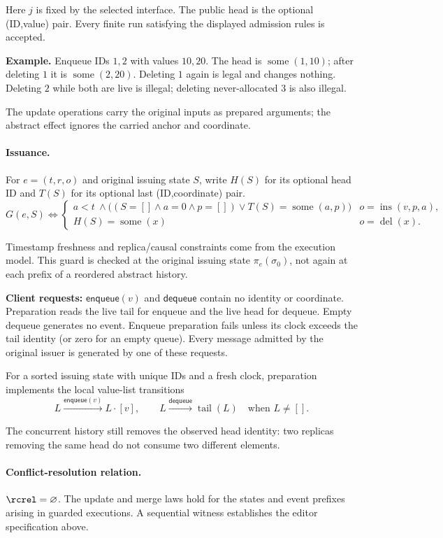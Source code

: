 Here $j$ is fixed by the selected interface. The public head is the optional (ID,value) pair. Every finite run satisfying the displayed admission rules is accepted.

\textbf{Example.} Enqueue IDs $1,2$ with values $10,20$. The head is $\operatorname{some}(1,10)$; after deleting $1$ it is $\operatorname{some}(2,20)$. Deleting $1$ again is legal and changes nothing. Deleting $2$ while both are live is illegal; deleting never-allocated $3$ is also illegal.

The update operations carry the original inputs as prepared arguments;
the abstract effect ignores the carried anchor and coordinate.


\paragraph{Issuance.}
For $e=(t,r,o)$ and original issuing state $S$, write $H(S)$ for its optional head ID and $T(S)$ for its optional last (ID,coordinate) pair.
\[
G(e,S)\iff\begin{cases}a<t\ \land\bigl((S=[]\land a=0\land p=[])\lor T(S)=\operatorname{some}(a,p)\bigr)&o=\operatorname{ins}(v,p,a),\\H(S)=\operatorname{some}(x)&o=\operatorname{del}(x).\end{cases}
\]

Timestamp freshness and replica/causal constraints come from the execution model. This guard is checked at the original issuing state $\pi_e(\sigma_0)$,
not again at each prefix of a reordered abstract history.

\textbf{Client requests:} $\mathsf{enqueue}(v)$ and $\mathsf{dequeue}$ contain no identity or coordinate. Preparation reads the live tail for enqueue and the live head for dequeue. Empty dequeue generates no event. Enqueue preparation fails unless its clock exceeds the tail identity (or zero for an empty queue). Every message admitted by the original issuer is generated by one of these requests.

For a sorted issuing state with unique IDs and a fresh clock, preparation implements the local value-list transitions
\[
L\xrightarrow{\mathsf{enqueue}(v)}L\cdot[v],\qquad
L\xrightarrow{\mathsf{dequeue}}\operatorname{tail}(L)\quad\text{when }L\ne[].
\]

The concurrent history still removes the observed head identity: two replicas removing the same head do not consume two different elements.


\paragraph{Conflict-resolution relation.}
$\rcrel=\varnothing$. The update and merge laws hold for the states and event prefixes arising in guarded executions. A sequential witness establishes the editor specification above.


